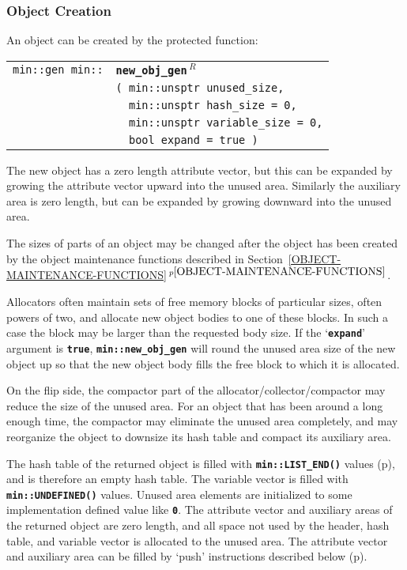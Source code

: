 \documentclass[12pt]{article}
\makeatletter
\newcommand{\TT}[1]{{\tt \bfseries #1}}
\newcommand{\ttindex}[1]{\index{#1@{\tt #1}}}
\newcommand{\itemref}[1]{\ref{#1}$\,^{p\pageref{#1}}$}
\newcommand{\pagref}[1]{p\pageref{#1}}
\newcommand{\EOL}{\penalty \exhyphenpenalty}
\newenvironment{indpar}[1][0.3in]%
	{\begin{list}{}%
		     {\setlength{\itemsep}{0in}%
		      \setlength{\topsep}{0in}%
		      \setlength{\parsep}{1ex}%
		      \setlength{\labelwidth}{#1}%
		      \setlength{\leftmargin}{#1}%
		      \addtolength{\leftmargin}{\labelsep}}%
	 \item}%
	{\end{list}}
\newcommand{\LABEL}[1]{\label{#1}}
\newlength{\ARGBREAKLENGTH}
\newcommand{\ARGBREAK}[1][\ARGBREAKLENGTH]{\\&\hspace*{#1}}
\newcommand{\MINKEY}[1]%
	   {\TT{#1}\ttindex{min::#1}\ttindex{#1}}
\newcommand{\REL}{$\,^R$}
\makeatother
\begin{document}
\subsubsection{Object Creation}
\label{OBJECT-CREATION}

An object can be created by the protected function:

\begin{indpar}\begin{tabular}{r@{}l}
\verb|min::gen min::| & \MINKEY{new\_obj\_gen\REL}\ARGBREAK
    \verb|( min::unsptr unused_size,|\ARGBREAK
    \verb|  min::unsptr hash_size = 0,|\ARGBREAK
    \verb|  min::unsptr variable_size = 0,|\ARGBREAK
    \verb|  bool expand = true )|
\LABEL{MIN::NEW_OBJ_GEN} \\
\end{tabular}\end{indpar}

The new object has a zero length attribute vector, but this can be
expanded by growing the attribute vector upward into the unused area.
Similarly the auxiliary area is zero length, but can be expanded by
growing downward into the unused area.

The sizes of parts of an object may be changed after the object has
been created by the object maintenance functions
described in Section~\itemref{OBJECT-MAINTENANCE-FUNCTIONS}.

Allocators often maintain sets of free memory blocks of particular
sizes, often powers of two, and allocate new object bodies to one
of these blocks.  In such a case the block may be larger than the
requested body size.  If the `\TT{expand}' argument is \TT{true},
\TT{min::\EOL new\_\EOL obj\_\EOL gen} will round the unused area
size of the new object up so that the new object body fills the
free block to which it is allocated.

On the flip side, the compactor part of the
allocator/\EOL collector/\EOL compactor
may reduce the size of the unused
area.  For an object that has been around a long enough time, the
compactor may eliminate the unused area completely, and may reorganize
the object to downsize its hash table and compact its auxiliary area.

The hash table of the returned object is filled with \TT{min::LIST\_END()}
values (\pagref{MIN::LIST_END}), and is therefore an empty hash table.
The variable vector is filled with \TT{min::UNDEFINED()} values.
Unused area elements are initialized to some implementation defined
value like \TT{0}.
The attribute vector and auxiliary areas of the returned object are
zero length, and all space not used by the header, hash table, and
variable vector is allocated to the unused area.
The attribute vector and auxiliary area can be
filled by `push' instructions described below
(\pagref{OBJECT_PUSH_FUNCTIONS}).
\end{document}
